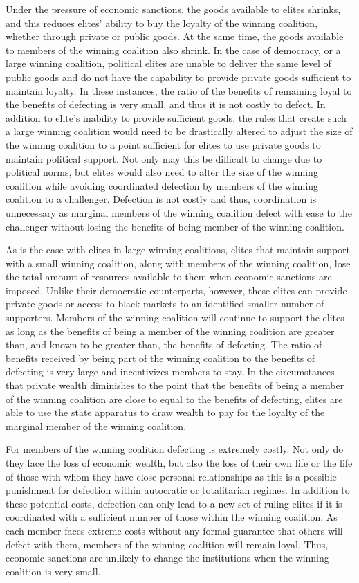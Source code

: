 \documentclass[a4paper]{article}\usepackage[]{graphicx}\usepackage[]{color}
\begin{document}
Under the pressure of economic sanctions, the goods available to elites shrinks, and this reduces elites' ability to buy the loyalty of the winning coalition, whether through private or public goods. At the same time, the goods available to members of the winning coalition also shrink. In the case of democracy, or a large winning coalition, political elites are unable to deliver the same level of public goods and do not have the capability to provide private goods sufficient to maintain loyalty. In these instances, the ratio of the benefits of remaining loyal to the benefits of defecting is very small, and thus it is not costly to defect. In addition to elite's inability to provide sufficient goods, the rules that create such a large winning coalition would need to be drastically altered to adjust the size of the winning coalition to a point sufficient for elites to use private goods to maintain political support. Not only may this be difficult to change due to political norms, but elites would also need to alter the size of the winning coalition while avoiding coordinated defection by members of the winning coalition to a challenger. Defection is not costly and thus, coordination is unnecessary as marginal members of the winning coalition defect with ease to the challenger without losing the benefits of being member of the winning coalition.
\par
As is the case with elites in large winning coalitions, elites that maintain support with a small winning coalition, along with members of the winning coalition, lose the total amount of resources available to them when economic sanctions are imposed. Unlike their democratic counterparts, however, these elites can provide private goods or access to black markets to an identified smaller number of supporters. Members of the winning coalition will continue to support the elites as long as the benefits of being a member of the winning coalition are greater than, and known to be greater than, the benefits of defecting. The ratio of benefits received by being part of the winning coalition to the benefits of defecting is very large and incentivizes members to stay. In the circumstances that private wealth diminishes to the point that the benefits of being a member of the winning coalition are close to equal to the benefits of defecting, elites are able to use the state apparatus to draw wealth to pay for the loyalty of the marginal member of the winning coalition.  
\par
For members of the winning coalition defecting is extremely costly. Not only do they face the loss of economic wealth, but also the loss of their own life or the life of those with whom they have close personal relationships as this is a possible punishment for defection within autocratic or totalitarian regimes. In addition to these potential costs, defection can only lead to a new set of ruling elites if it is coordinated with a sufficient number of those within the winning coalition. As each member faces extreme costs without any formal guarantee that others will defect with them, members of the winning coalition will remain loyal. Thus, economic sanctions are unlikely to change the institutions when the winning coalition is very small. 
\end{document}
